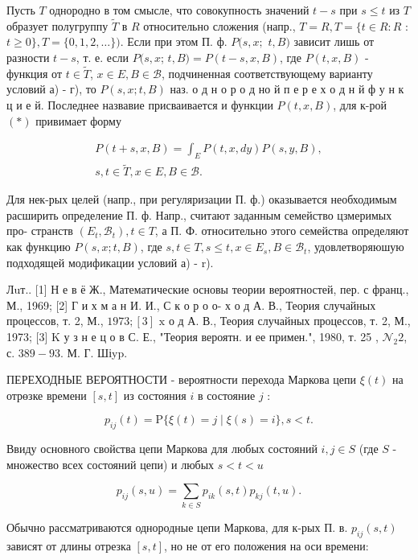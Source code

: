 \documentclass[10pt]{article}
\begin{document}
Пусть $T$ однородно в том смысле, что совокупность значений $t-s$ при $s \leqslant t$ из $T$ образует полугруппу $\tilde{T}$ в $R$ относительно сложения (напр., $T=R, T=\{t \in R: R$ : $t \geqslant 0\}, T=\{0,1,2, \ldots\})$. Если при этом П. ф. $P(s, x ;$ $t, B)$ зависит лишь от разности $t-s$, т. е. если $P(s, x$; $t, B)=P(t-s, x, B)$, где $P(t, x, B)$ - функция от $t \in \tilde{T}$, $x \in E, B \in \mathscr{B}$, подчиненная соответствующему варианту условий а) - г), то $P(s, x ; t, B)$ наз. о д н о р о д но й п е р е х о д н й ф у н к ц и е й. Последнее назвавие присваивается и функции $P(t, x, B)$, для к-рой $(*)$ привимает форму

\[
\begin{gathered}
P(t+s, x, B)=\int_{E} P(t, x, d y) P(s, y, B), \\
s, t \in \tilde{T}, x \in E, B \in \mathscr{B} .
\end{gathered}
\]

Для нек-рых целей (напр., при регуляризации П. ф.) оказывается необходимым расширить определение П. ф. Напр., считают заданным семейство цзмеримых про- странств $\left(E_{t}, \mathscr{B}_{t}\right), t \in T$, а П. Ф. относительно этого семейства определяют как функцию $P(s, x ; t, B)$, где $s, t \in T, s \leqslant t, x \in E_{s}, B \in \mathscr{B}_{t}$, удовлетворяюшую подходящей модификации условий а) - r).

Лuт.. [1] Н е в ё Ж., Математические основы теории вероятностей, пер. с франц., М., 1969; [2] Г и х м а н И. И., С к о р о о-
х о д А. В., Теория случайных процессов, т. 2, М., $1973 ;[3]$ $\mathrm{x}$ о д А. В., Теория случайных процессов, т. 2, М., 1973; [3]
$\mathrm{K}$ у з н е ц о в С. Е., "Теория вероятн. и ее примен.", 1980, т. 25 , $\mathcal{N}_{2} 2$, с. $389-93$. М. Г. Шіyp.

ПЕРЕХОДНЫЕ ВЕРОЯТНОСТИ - вероятности перехода Маркова цепи $\xi(t)$ на отрөзке времени $[s, t]$ из состояния $i$ в состояние $j$ :

\[
p_{i j}(t)=\mathrm{P}\{\xi(t)=j \mid \xi(s)=i\}, s<t .
\]

Ввиду основного свойства цепи Маркова для любых состояний $i, j \in S$ (где $S$ - множество всех состояний цепи) и любых $s<t<u$

\[
p_{i j}(s, u)=\sum_{k \in S} p_{i k}(s, t) p_{k j}(t, u) .
\]

Обычно рассматриваются однородные цепи Маркова, для к-рых П. в. $p_{i j}(s, t)$ зависят от длины отрезка $[s, t]$, но не от его положения на оси времени:
\end{document}
